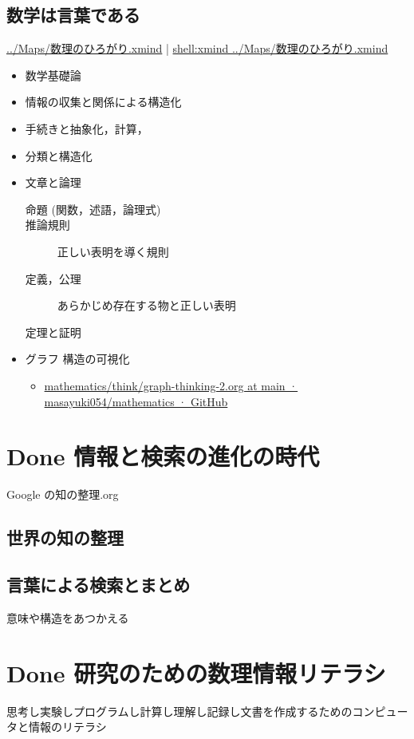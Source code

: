 \documentclass[dvipdfmx,11pat]{jarticle}
\begin{document}
\subsection{数学は言葉である}
\label{sec:orgd0998db}
\url{../Maps/数理のひろがり.xmind} | \url{shell:xmind ../Maps/数理のひろがり.xmind}
\begin{itemize}
\item 数学基礎論
\item[{集合と構造}] 情報の収集と関係による構造化
\item[{集合と関数}] 手続きと抽象化，計算，
\item[{集合と関係}] 分類と構造化
\item[{数理論理学}] 文章と論理
\begin{description}
\item[{命題 (関数，述語，論理式)}] 

\item[{推論規則}] 正しい表明を導く規則
\item[{定義，公理}] あらかじめ存在する物と正しい表明
\item[{定理と証明}] 
\end{description}
\item グラフ 構造の可視化
\begin{itemize}
\item \href{https://github.com/masayuki054/mathematics/blob/main/think/graph-thinking-2.org}{mathematics/think/graph-thinking-2.org at main · masayuki054/mathematics · GitHub}
\end{itemize}
\end{itemize}
\section{{\bfseries\sffamily Done} 情報と検索の進化の時代}
\label{sec:org4b4fa7f}
Google の知の整理.org
\subsection{世界の知の整理}
\label{sec:org3986c45}
\subsection{言葉による検索とまとめ}
\label{sec:org458326c}
意味や構造をあつかえる
\section{{\bfseries\sffamily Done} 研究のための数理情報リテラシ}
\label{sec:org1cdfd72}
思考し実験しプログラムし計算し理解し記録し文書を作成するためのコンピュー
タと情報のリテラシ
\end{document}
